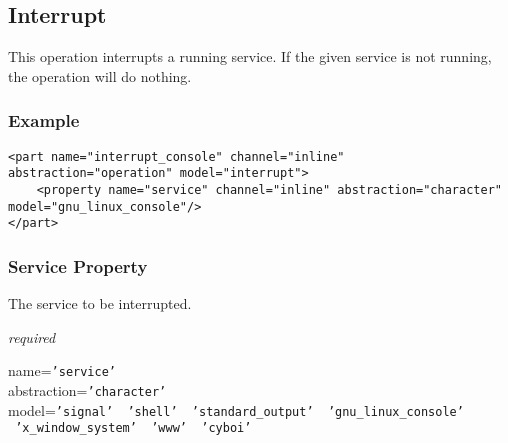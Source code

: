 %
%
%
%
%
%

\subsection{Interrupt}
\label{interrupt_heading}

This operation interrupts a running service. If the given service is not
running, the operation will do nothing.

\subsubsection{Example}

\begin{scriptsize}
    \begin{verbatim}
<part name="interrupt_console" channel="inline" abstraction="operation" model="interrupt">
    <property name="service" channel="inline" abstraction="character" model="gnu_linux_console"/>
</part>
    \end{verbatim}
\end{scriptsize}

\subsubsection{Service Property}

The service to be interrupted.

\emph{required}

name=\texttt{'service'}\\
abstraction=\texttt{'character'}\\
model=\texttt{'signal' \vline\ 'shell' \vline\ 'standard\_output'
    \vline\ 'gnu\_linux\_console' \vline\ 'x\_window\_system' \vline\ 'www' \vline\ 'cyboi'}
